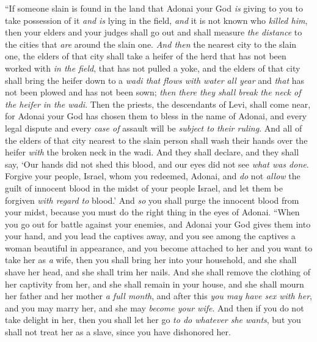 \begin{biblechapter} %
\verse “If someone slain is found in the land that Adonai your God \textit{is} giving to you to take possession of it \textit{and} \textit{is} lying in the field, \textit{and} it is not known who \textit{killed him},
\verse then your elders and your judges shall go out and shall measure \textit{the distance} to the cities that \textit{are} around the slain one.
\verse \textit{And then} the nearest city to the slain one, the elders of that city shall take a heifer of the herd that has not been worked with \textit{in the field}, that has not pulled a yoke,
\verse and the elders of that city shall bring the heifer down to a \textit{wadi that flows with water all year} and \textit{that} has not been plowed and has not been sown; \textit{then} \textit{there they shall break the neck of the heifer in the wadi}.
\verse Then the priests, the descendants of Levi, shall come near, for Adonai your God has chosen them to bless in the name of Adonai, and every legal dispute and every \textit{case of} assault will be \textit{subject to their ruling}.
\verse And all of the elders of that city nearest to the slain person shall wash their hands over the heifer \textit{with} the broken neck in the wadi.
\verse And they shall declare, and they shall say, ‘Our hands did not shed this blood, and our eyes did not see \textit{what was done}.
\verse Forgive your people, Israel, whom you redeemed, Adonai, and \textit{do} not \textit{allow} the guilt of innocent blood in the midst of your people Israel, and let them be forgiven \textit{with regard to} blood.’
\verse And \textit{so} you shall purge the innocent blood from your midst, because you must do the right thing in the eyes of Adonai.
\verse “When you go out for battle against your enemies, and Adonai your God gives them into your hand, and you lead the captives away,
\verse and you see among the captives a woman beautiful in appearance, and you become attached to her and you want to take her as \textit{a} wife,
\verse then you shall bring her into your household, and she shall shave her head, and she shall trim her nails.
\verse And she shall remove the clothing of her captivity from her, and she shall remain in your house, and she shall mourn her father and her mother \textit{a full month}, and after this \textit{you may have sex with her}, and you may marry her, and she may \textit{become your wife}.
\verse And then if you do not take delight in her, then you shall let her go \textit{to do whatever she wants}, but you shall not treat her as a slave, since you have dishonored her.

\end{biblechapter}
